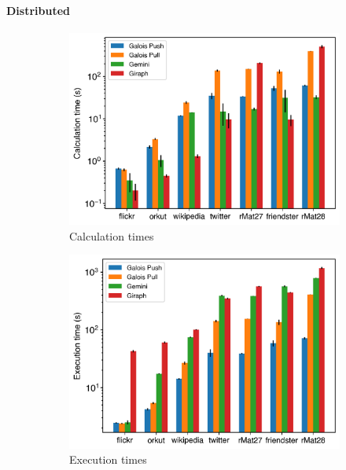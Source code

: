 \paragraph{Distributed}
\begin{figure}
	\centering
	\begin{subfigure}{0.32\textwidth}
		\includegraphics[width=\linewidth]{../../plots/distributedSSSP_calcTime.png}
		\caption{Calculation times}
		\label{fig:distributedSSSP_calc}
	\end{subfigure}
	\hfil
	\begin{subfigure}{0.32\textwidth}
		\includegraphics[width=\linewidth]{../../plots/distributedSSSP_execTime.png}
		\caption{Execution times}
		\label{fig:distributedSSSP_exec}
	\end{subfigure}
	\hfil
	\begin{subfigure}{0.32\textwidth}

\end{subfigure}
\end{figure}
